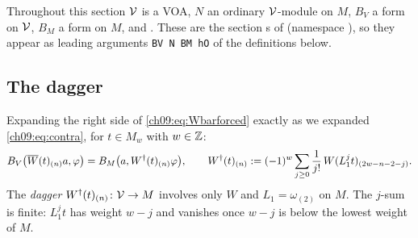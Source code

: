 Throughout this section $\mathcal{V}$ is a VOA, $N$ an ordinary $\mathcal{V}$-module on $M$, $B_V$ a form on
$\mathcal{V}$, $B_M$ a form on $M$, and . These are the section
s of  (namespace ),
so they appear as leading arguments \texttt{BV N BM hO} of the definitions below.

\subsection{The dagger}

Expanding the right side of \eqref{ch09:eq:Wbarforced} exactly as we expanded
\eqref{ch09:eq:contra}, for $t\in M_w$ with $w\in{\mathbb{Z}}$:
\begin{equation}\label{ch09:eq:dagger}
B_V\big(\overline{W}(t)_{(n)}a,\varphi\big)=B_M\big(a,W^{\dagger}(t)_{(n)}\varphi\big),\qquad
W^{\dagger}(t)_{(n)}:=(-1)^w\sum_{j\ge0}\frac1{j!}\,W(L_1^jt)_{(2w-n-2-j)} .
\end{equation}
The \emph{dagger} $W^{\dagger}(t)_{(n)}\colon\mathcal{V}\to M$ involves only $W$ and $L_1=\omega_{(2)}$ on $M$.
The $j$-sum is finite: $L_1^jt$ has weight $w-j$ and vanishes once $w-j$ is below the lowest weight
of $M$.

